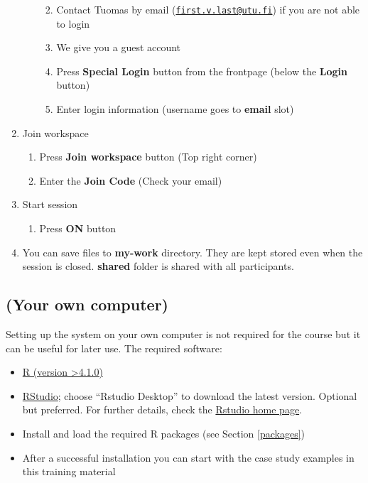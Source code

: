 \documentclass[
  oneside]{book}
\providecommand{\tightlist}{%
  \setlength{\itemsep}{0pt}\setlength{\parskip}{0pt}}
\begin{document}
\begin{enumerate}
\begin{enumerate}
    \begin{enumerate}
    \def\labelenumiii{\arabic{enumiii}.}
    \tightlist
    \item
      Contact Tuomas by email (\href{mailto:first.v.last@utu.fi}{\nolinkurl{first.v.last@utu.fi}}) if you are not able to login
    \item
      We give you a guest account
    \item
      Press \textbf{Special Login} button from the frontpage (below the \textbf{Login} button)
    \item
      Enter login information (username goes to \textbf{email} slot)
    \end{enumerate}
  \end{enumerate}
\item
  Join workspace

  \begin{enumerate}
  \def\labelenumii{\alph{enumii}.}
  \tightlist
  \item
    Press \textbf{Join workspace} button (Top right corner)
  \item
    Enter the \textbf{Join Code} (Check your email)
  \end{enumerate}
\item
  Start session

  \begin{enumerate}
  \def\labelenumii{\alph{enumii}.}
  \tightlist
  \item
    Press \textbf{ON} button
  \end{enumerate}
\item
  You can save files to \textbf{my-work} directory. They are kept stored even when the session is closed. \textbf{shared} folder is shared with all participants.
\end{enumerate}

\hypertarget{your-own-computer}{%
\subsection{(Your own computer)}\label{your-own-computer}}

Setting up the system on your own computer is not required for the
course but it can be useful for later use. The required software:

\begin{itemize}
\item
  \href{https://www.r-project.org/}{R (version \textgreater4.1.0)}
\item
  \href{https://www.rstudio.com/products/rstudio/download/}{RStudio};
  choose ``Rstudio Desktop'' to download the latest version. Optional
  but preferred. For further details, check the \href{https://www.rstudio.com/}{Rstudio home
  page}.
\item
  Install and load the required R packages (see Section \ref{packages})
\item
  After a successful installation you can start with the
  case study examples in this training material
\end{itemize}
\end{document}
